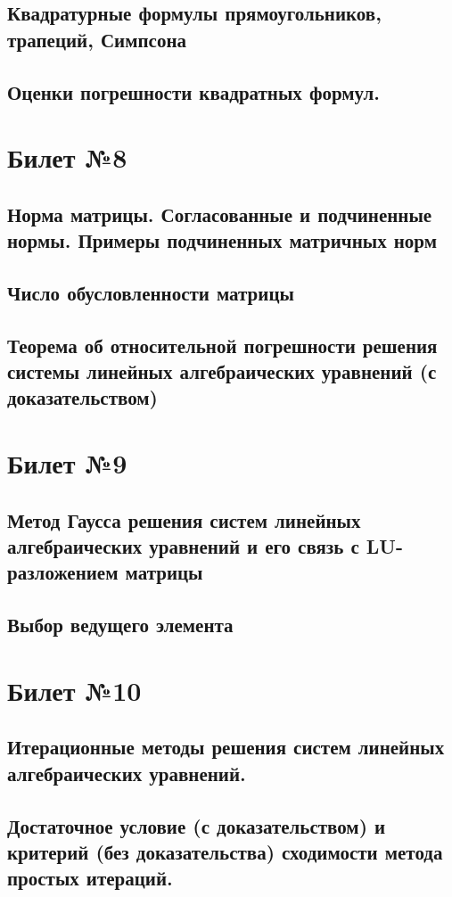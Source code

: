 \documentclass[a4paper]{article}
\begin{document}
\subsection{Квадратурные формулы прямоугольников, трапеций, Симпсона}
\subsection{Оценки погрешности квадратных формул.}

\section{Билет №8}
\subsection{Норма матрицы. Согласованные и подчиненные нормы. Примеры подчиненных матричных норм}
\subsection{Число обусловленности матрицы}
\subsection{Теорема об относительной погрешности решения системы линейных алгебраических уравнений (с доказательством)}

\section{Билет №9}
\subsection{Метод Гаусса решения систем линейных алгебраических уравнений и его связь с LU-разложением матрицы}
\subsection{Выбор ведущего элемента}

\section{Билет №10}
\subsection{Итерационные методы решения систем линейных алгебраических уравнений.}
\subsection{Достаточное условие (с доказательством) и критерий (без доказательства) сходимости метода простых итераций.}
\end{document}
